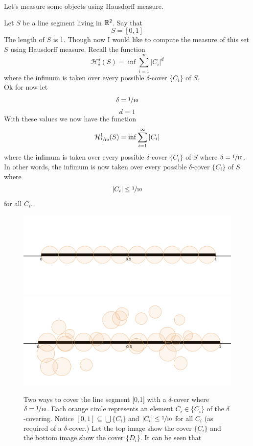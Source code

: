 \documentclass[11pt]{ekblite}
\begin{document}
Let's measure some objects using Hausdorff measure.
\begin{example}
	Let $S$ be a line segment living in $\mathbb{R}^2$. Say that
	\[S = [0,1]\]
	The length of $S$ is 1. Though now I would like to compute the measure of this set $S$ using Hausdorff measure. Recall the function
	\[\mathcal{H}_{\delta}^d (S) = \inf \sum_{i=1}^{\infty} |C_i|^d\]
	where the infimum is taken over every possible $\delta$-cover $\{C_i\}$ of $S$.
	\\[0.2in]Ok for now let
	\[\delta = \sfrac{1}{10}\]
	\[d = 1\]
	With these values we now have the function
	\[\mathcal{H}_{\sfrac{1}{10}}^{1} (S) = \inf \sum_{i=1}^{\infty} |C_i|\]
	where the infimum is taken over every possible $\delta$-cover $\{C_i\}$ of $S$ where $\delta = \sfrac{1}{10}$.
	\\[0.2in]In other words, the infimum is now taken over every possible $\delta$-cover $\{C_i\}$ of $S$ where
	\[|C_i| \le \sfrac{1}{10}\]
	for all $C_i$. 
	\begin{figure}[h]
		\includegraphics[scale=0.25]{img/c19.jpg}
		\includegraphics[scale=0.26]{img/c18.jpg}
		\caption{Two ways to cover the line segment [0,1] with a $\delta$-cover where $\delta = \sfrac{1}{10}$. Each orange circle represents an element $C_i \in \{C_i\}$ of the $\delta$-covering. Notice $[0,1] \subseteq \bigcup \{C_i\}$ and $|C_i| \le \sfrac{1}{10}$ for all $C_i$ (as required of a $\delta$-cover.) Let the top image show the cover $\{C_i\}$ and the bottom image show the cover $\{D_i\}$. It can be seen that}

\end{figure}
\end{example}
\end{document}
